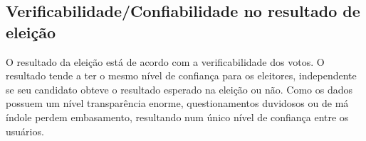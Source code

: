     \subsection{Verificabilidade/Confiabilidade no resultado de eleição}
        O resultado da eleição está de acordo com a verificabilidade dos votos. O resultado tende a ter o mesmo nível de confiança para os eleitores, independente se seu candidato obteve o resultado esperado na eleição ou não. Como os dados possuem um nível transparência enorme, questionamentos duvidosos ou de má índole perdem embasamento, resultando num único nível de confiança entre os usuários.      

